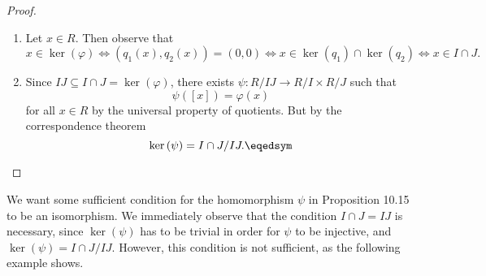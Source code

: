 \documentclass[pmath347]{subfiles}
\begin{document}
    \begin{proof}
        \begin{enumerate}
            \item Let $x\in R$. Then observe that
                \begin{equation*}
                    x\in\ker\left( \varphi \right) \iff \left( q_1\left( x \right) , q_2\left( x \right)  \right) = \left( 0,0 \right) \iff x\in\ker\left( q_1 \right) \cap \ker\left( q_2 \right) \iff x\in I\cap J. 
                \end{equation*}
            \item Since $IJ\subseteq I\cap J=\ker\left( \varphi \right)$, there exists $\psi:R /IJ\to R /I\times R /J$ such that
                \begin{equation*}
                    \psi\left( \left[ x \right]  \right) = \varphi\left( x \right) 
                \end{equation*}
                for all $x\in R$ by the universal property of quotients. But by the correspondence theorem
                \begin{equation*}
                    \ker\left( \psi \right) = I\cap J /IJ. \eqedsym
                \end{equation*}
        \end{enumerate}
    \end{proof}

    \noindent We want some sufficient condition for the homomorphism $\psi$ in Proposition 10.15 to be an isomorphism. We immediately observe that the condition $I\cap J = IJ$ is necessary, since $\ker\left( \psi \right)$ has to be trivial in order for $\psi$ to be injective, and $\ker\left( \psi \right) = I\cap J /IJ$. However, this condition is not sufficient, as the following example shows.
\end{document}
